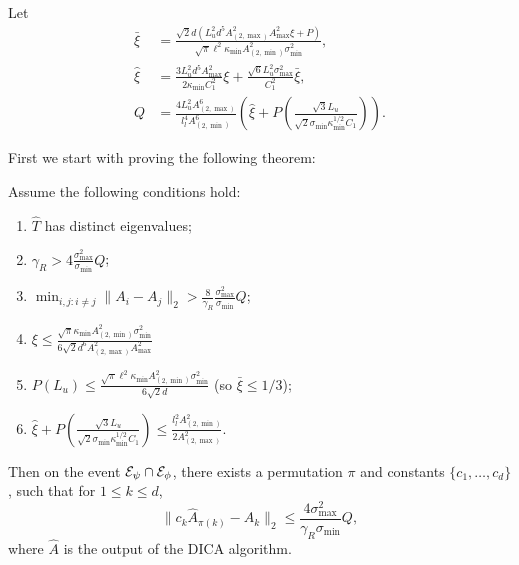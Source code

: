 Let 
\begin{align*}
\bar{\xi} &=   \frac{\sqrt{2}d\left(L_u^2d^5 A_{(2,\max)}^2A_{\max}^2\xi + P\right)}{\sqrt{\pi}\ell^2\kappa_{\min}A^2_{(2,\min)}\sigma_{\min}^2}, \\
\hat{\xi} &= \frac{3L_u^2d^5A^2_{\max}}{2\kappa_{\min}C_1^2}\xi + \frac{\sqrt{6}L_u^2\sigma_{\max}^2}{C_1^2}\bar{\xi}, \\
 Q &=  
 \frac{4L_u^2A^6_{(2,\max)}}{l_l^4 A^6_{(2,\min)}}\left(\hat{\xi}
 +
 P\left(\frac{\sqrt{3}L_u}{\sqrt{2}\sigma_{\min}\kappa_{\min}^{1/2}C_1}\right)\right).
\end{align*} 

First we start with proving the following theorem:
\begin{theorem}
\label{thm:Modefficiency}
 Assume the following conditions hold:
 \begin{enumerate}
 \vspace{-3mm}
 \item $\hat{T}$ has distinct eigenvalues;
 \item $\gamma_R > 4 \frac{\sigma_{\max}^2}{\sigma_{\min}}Q$; 
 \item $\min_{i,j:i\neq j} \|A_i - A_j\|_2 > \frac{8}{\gamma_R}\frac{\sigma_{\max}^2}{\sigma_{\min}} Q$;
 \item $\xi \le \frac{\sqrt{\pi}\kappa_{\min}A^2_{(2,\min)}\sigma_{\min}^2}{6\sqrt{2}d^6A_{(2,\max)}^2A_{\max}^2}$
 \item $P(L_u) \le \frac{\sqrt{\pi}\ell^2\kappa_{\min}A^2_{(2,\min)}\sigma_{\min}^2}{6\sqrt{2}d}$
 (so $\bar{\xi} \le 1/3$);
 \item $\hat{\xi}
  +
  P\left(\frac{\sqrt{3}L_u}{\sqrt{2}\sigma_{\min}\kappa_{\min}^{1/2}C_1}\right) \le \frac{l_l^2 A^2_{(2,\min)}}{2A^2_{(2,\max)}}$.
 \end{enumerate}
 \vspace{-2mm}
Then on the event $\mathcal{E}_{\psi} \cap\mathcal{E}_{\phi}$, there exists a permutation $\pi$ and constants $\{c_1,\ldots,c_d\}$, such that for $1\le k\le d$,
\[
\| c_k\hat{A}_{\pi(k)} - A_k\|_2 \le \frac{4\sigma^2_{\max}}{\gamma_R\sigma_{\min}} Q,
\]
where $\hat{A}$ is the output of the DICA algorithm.
\end{theorem}

